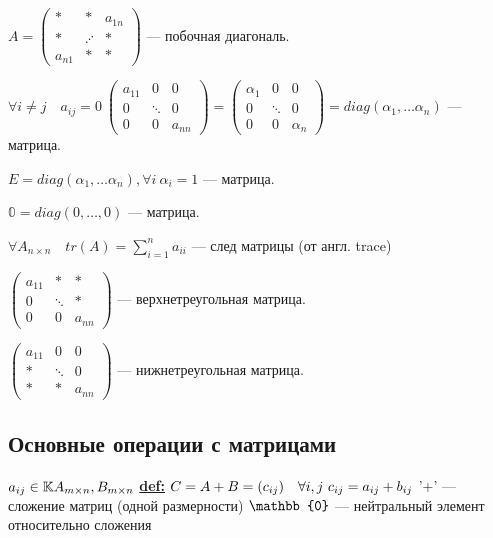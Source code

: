 \( A =
\begin{pmatrix}
    *      & *       & a_{1n} \\
    *      & \iddots & *      \\
    a_{n1} & *       & *
\end{pmatrix}\) --- побочная диагональ.

\( \forall i \neq j \quad a_{ij} = 0\:
\begin{pmatrix}
    a_{11} & 0      & 0      \\
    0      & \ddots & 0      \\
    0      & 0      & a_{nn}
\end{pmatrix} =
\begin{pmatrix}
    \alpha_{1} & 0      & 0          \\
    0          & \ddots & 0          \\
    0          & 0      & \alpha_{n}
\end{pmatrix}
= diag(\alpha_1, \ldots \alpha_n)
\) ---  матрица.

\( E = diag(\alpha_1, \ldots \alpha_n), \forall i\: \alpha_i=1\) ---  матрица.

$\mathbb{0} = diag(0, \ldots, 0)$ ---  матрица.

\( \forall A_{n \times n} \quad tr(A) = \displaystyle{\sum^{n}_{i=1}}a_{ii}\) --- след матрицы (от англ. trace)

\(
\begin{pmatrix}
    a_{11} & *      & *      \\
    0      & \ddots & *      \\
    0      & 0      & a_{nn}
\end{pmatrix}
\) --- верхнетреугольная матрица.

\(
\begin{pmatrix}
    a_{11} & 0      & 0      \\
    *      & \ddots & 0      \\
    *      & *      & a_{nn}
\end{pmatrix}
\) --- нижнетреугольная матрица.

\subsection{Основные операции с матрицами}
\(a_{ij} \in \mathbb{K} \newline
A_{m \times n}, B_{m \times n} \newline\)
\textbf{\underline{def:}} \( C = A + B = (c_{ij})\quad \forall i,j \  c_{ij}=a_{ij}+b_{ij} \newline\)
'+' --- сложение матриц (одной размерности)
\( \newline \mathbb{0} \) --- нейтральный элемент относительно сложения

